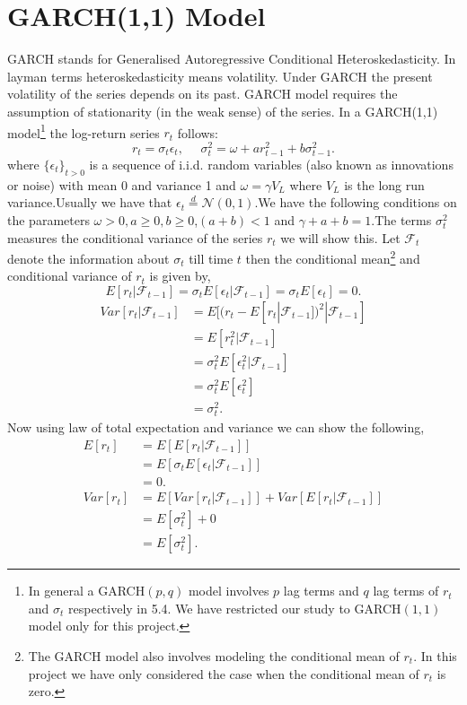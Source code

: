 \documentclass[12pt]{report}
\begin{document}
\section{GARCH(1,1) Model}
GARCH stands for Generalised Autoregressive Conditional  Heteroskedasticity. In layman terms heteroskedasticity means volatility. Under GARCH the present volatility of the series depends on its past. GARCH model requires the assumption of stationarity (in the weak sense) of the series. 
In a GARCH(1,1) model\footnote{In general a GARCH$(p,q)$ model involves $p$ lag terms and $q$ lag terms of $r_t$ and $\sigma_t$ respectively in 5.4. We have restricted our study to GARCH$(1,1)$ model only for this project.} the log-return series $r_t$ follows:\\
\begin{equation}
 r_t = \sigma_t \epsilon_t ,~~~~~~ \sigma^{2}_t = \omega + a r^{2}_{t-1} + b \sigma^{2}_{t-1}. 
\label{garch_sigma} 
\end{equation}
where $\{\epsilon_t\}_{t >0}$ is a sequence of i.i.d. random variables (also known as innovations or noise) with mean 0 and variance 1 and $\omega = \gamma V_L$ where $V_L$ is the long run variance.Usually we have that $\epsilon_t \stackrel{d}{=} \mathcal{N}(0,1)$.We have the following conditions on the parameters $\omega > 0,a \geq 0,b \geq 0 $,$(a + b) < 1$ and $\gamma + a + b =1$.The terms  $\sigma^{2}_t$ measures the conditional variance of the series $r_t$ we will show this. Let $\mathcal{F}_t$ denote the information about $\sigma_t$ till time $t$ then the conditional mean\footnote{The GARCH model also involves modeling the conditional mean of $r_t$. In this project we have only considered the case when the conditional mean of $r_t$ is zero.} and conditional variance of $r_t$ is given by,\\
$$E[r_t|\mathcal{F}_{t-1}] = \sigma_t E[\epsilon_t|\mathcal{F}_{t-1}] = \sigma_t E[\epsilon_t] = 0.$$
\begin{align*}
Var[r_t|\mathcal{F}_{t-1}] &= E[(r_t - E[r_t|\mathcal{F}_{t-1}] )^{2}|\mathcal{F}_{t-1}]\\
& = E[r_t^{2}|\mathcal{F}_{t-1}]\\
& = \sigma_t^{2} E[\epsilon_t^{2}|\mathcal{F}_{t-1}]\\
& = \sigma_t^{2} E[\epsilon_t^{2}]\\
& = \sigma_t^{2}.
\end{align*}
Now using law of total expectation and variance we can show the following,
\begin{align*}
E[r_t] & = E[E[r_t|\mathcal{F}_{t-1}]]\\
& = E[\sigma_t E[\epsilon_t|\mathcal{F}_{t-1}]]\\
& = 0.\\
Var[r_t] & = E[Var[r_t|\mathcal{F}_{t-1}]] + Var[E[r_t|\mathcal{F}_{t-1}]]\\
& = E[\sigma_t^{2}] + 0\\
& = E[\sigma_t^{2}].
\end{align*}
\end{document}
